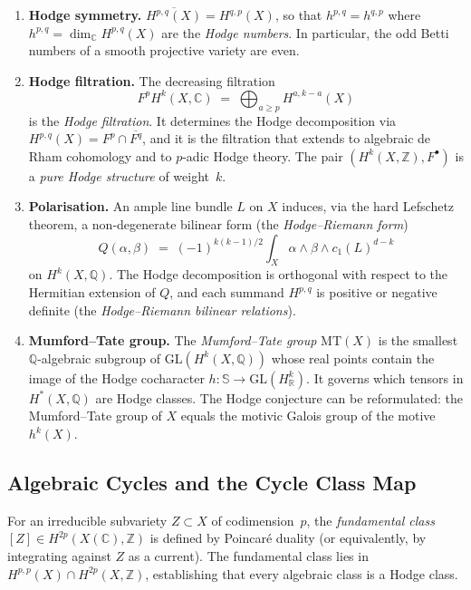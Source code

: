 \documentclass[11pt]{article}
\theoremstyle{definition}
\begin{document}
\begin{enumerate}[label=(\roman*)]
  \item \textbf{Hodge symmetry.}
    $\overline{H^{p,q}(X)} = H^{q,p}(X)$, so that $h^{p,q} = h^{q,p}$
    where $h^{p,q} = \dim_{\mathbb{C}} H^{p,q}(X)$ are the \emph{Hodge
    numbers}.  In particular, the odd Betti numbers of a smooth projective
    variety are even.

  \item \textbf{Hodge filtration.}
    The decreasing filtration
    \[
      F^p H^k(X, \mathbb{C})
      \;=\;
      \bigoplus_{a \geq p} H^{a, k-a}(X)
    \]
    is the \emph{Hodge filtration}.  It determines the Hodge decomposition
    via $H^{p,q}(X) = F^p \cap \overline{F^q}$, and it is the filtration
    that extends to algebraic de Rham cohomology and to $p$-adic Hodge
    theory.  The pair $(H^k(X, \mathbb{Z}), F^{\bullet})$ is a
    \emph{pure Hodge structure} of weight~$k$.

  \item \textbf{Polarisation.}
    An ample line bundle $L$ on $X$ induces, via the hard Lefschetz theorem,
    a non-degenerate bilinear form (the \emph{Hodge--Riemann form})
    \[
      Q(\alpha, \beta)
      \;=\;
      (-1)^{k(k-1)/2} \int_X \alpha \wedge \beta \wedge c_1(L)^{d-k}
    \]
    on $H^k(X, \mathbb{Q})$.  The Hodge decomposition is orthogonal with
    respect to the Hermitian extension of $Q$, and each summand $H^{p,q}$ is
    positive or negative definite (the \emph{Hodge--Riemann bilinear
    relations}).

  \item \textbf{Mumford--Tate group.}
    The \emph{Mumford--Tate group} $\mathrm{MT}(X)$ is the smallest
    $\mathbb{Q}$-algebraic subgroup of $\mathrm{GL}(H^k(X, \mathbb{Q}))$
    whose real points contain the image of the Hodge cocharacter
    $h : \mathbb{S} \to \mathrm{GL}(H^k_{\mathbb{R}})$.  It governs which
    tensors in $H^*(X, \mathbb{Q})$ are Hodge classes.  The Hodge conjecture
    can be reformulated: the Mumford--Tate group of $X$ equals the motivic
    Galois group of the motive $h^k(X)$.
\end{enumerate}

\subsection{Algebraic Cycles and the Cycle Class Map}
\label{sec:cycle-class}

For an irreducible subvariety $Z \subset X$ of codimension~$p$, the
\emph{fundamental class} $[Z] \in H^{2p}(X(\mathbb{C}), \mathbb{Z})$ is
defined by Poincar\'e duality (or equivalently, by integrating against $Z$
as a current).  The fundamental class lies in $H^{p,p}(X) \cap H^{2p}(X,
\mathbb{Z})$, establishing that every algebraic class is a Hodge class.
\end{document}
